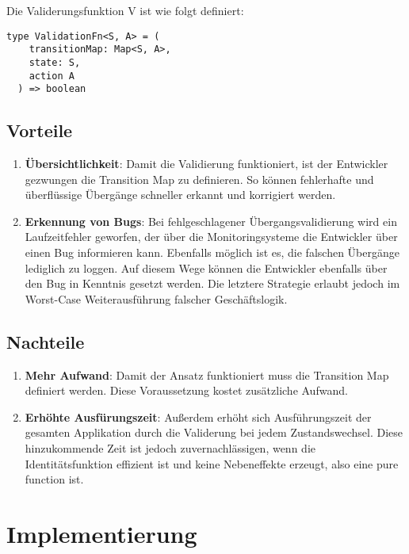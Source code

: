 Die Validerungsfunktion V ist wie folgt definiert:

\begin{lstlisting}
type ValidationFn<S, A> = (
    transitionMap: Map<S, A>,
    state: S,
    action A
  ) => boolean
\end{lstlisting}

\subsection{Vorteile}

\begin{enumerate}
  \item \textbf{Übersichtlichkeit}: Damit die Validierung funktioniert, ist der Entwickler gezwungen die Transition Map zu definieren. So können fehlerhafte und überflüssige Übergänge schneller erkannt und korrigiert werden.
  \item \textbf{Erkennung von Bugs}: Bei fehlgeschlagener Übergangsvalidierung wird ein Laufzeitfehler geworfen, der über die Monitoringsysteme die Entwickler über einen Bug informieren kann. Ebenfalls möglich ist es, die falschen Übergänge lediglich zu loggen. Auf diesem Wege können die Entwickler ebenfalls über den Bug in Kenntnis gesetzt werden. Die letztere Strategie erlaubt jedoch im Worst-Case Weiterausführung falscher Geschäftslogik.
\end{enumerate}

\subsection{Nachteile}

\begin{enumerate}
  \item \textbf{Mehr Aufwand}: Damit der Ansatz funktioniert muss die Transition Map definiert werden. Diese Voraussetzung kostet zusätzliche Aufwand.
  \item \textbf{Erhöhte Ausfürungszeit}: Außerdem erhöht sich Ausführungszeit der gesamten Applikation durch die Validerung bei jedem Zustandswechsel. Diese hinzukommende Zeit ist jedoch zuvernachlässigen, wenn die Identitätsfunktion effizient ist und keine Nebeneffekte erzeugt, also eine pure function ist.
\end{enumerate}

\section{Implementierung}

